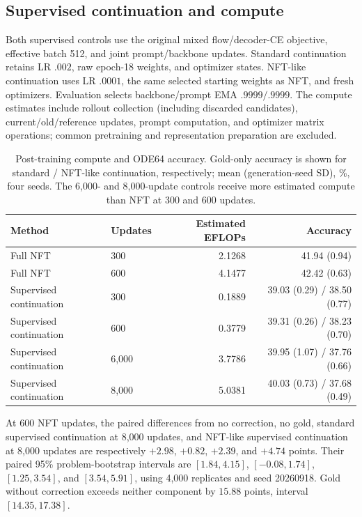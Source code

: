 \documentclass{article}
\newenvironment{revision}{\begingroup\color{blue}}{\endgroup}
\begin{document}
\begin{revision}
\subsection{Supervised continuation and compute}
Both supervised controls use the original mixed flow/decoder-CE objective, effective batch 512, and joint prompt/backbone updates. Standard continuation retains LR $.002$, raw epoch-18 weights, and optimizer states. NFT-like continuation uses LR $.0001$, the same selected starting weights as NFT, and fresh optimizers. Evaluation selects backbone/prompt EMA $.9999/.9999$. The compute estimates include rollout collection (including discarded candidates), current/old/reference updates, prompt computation, and optimizer matrix operations; common pretraining and representation preparation are excluded.

\begin{table}[htbp]\color{blue}\centering\small
\caption{Post-training compute and ODE64 accuracy. Gold-only accuracy is shown for standard / NFT-like continuation, respectively; mean (generation-seed SD), \%, four seeds. The 6,000- and 8,000-update controls receive more estimated compute than NFT at 300 and 600 updates.}
\label{tab:nftcontrolcompute}
\begin{tabular}{@{}llrr@{}}\toprule
Method & Updates & Estimated EFLOPs & Accuracy\\\midrule
Full NFT & 300 & 2.1268 & 41.94 (0.94)\\
Full NFT & 600 & 4.1477 & 42.42 (0.63)\\
Supervised continuation & 300 & 0.1889 & 39.03 (0.29) / 38.50 (0.77)\\
Supervised continuation & 600 & 0.3779 & 39.31 (0.26) / 38.23 (0.70)\\
Supervised continuation & 6,000 & 3.7786 & 39.95 (1.07) / 37.76 (0.66)\\
Supervised continuation & 8,000 & 5.0381 & 40.03 (0.73) / 37.68 (0.49)\\\bottomrule
\end{tabular}
\end{table}

At 600 NFT updates, the paired differences from no correction, no gold, standard supervised continuation at 8,000 updates, and NFT-like supervised continuation at 8,000 updates are respectively $+2.98$, $+0.82$, $+2.39$, and $+4.74$ points. Their paired 95\% problem-bootstrap intervals are $[1.84,4.15]$, $[-0.08,1.74]$, $[1.25,3.54]$, and $[3.54,5.91]$, using 4,000 replicates and seed 20260918. Gold without correction exceeds neither component by $15.88$ points, interval $[14.35,17.38]$.


\end{revision}
\end{document}
